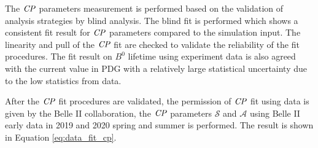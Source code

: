  

The $\it{CP}$ parameters measurement is performed based on the validation of analysis strategies by blind analysis.  
The blind fit is performed which shows a consistent fit result for $\it{CP}$ parameters compared to the simulation input. The linearity and pull of the $\it{CP}$ fit are checked to validate the reliability of the fit procedures. The fit result on $B^0$ lifetime using experiment data is also agreed with the current value in PDG with a relatively large statistical uncertainty due to the low statistics from data.

After the $\it{CP}$ fit procedures are validated, the permission of $\it{CP}$ fit using data is given by the Belle II collaboration, the $\it{CP}$ parameters $\mathcal{S}$ and $\mathcal{A}$ using Belle II early data in 2019 and 2020 spring and summer is performed. The result is shown in Equation \ref{eq:data_fit_cp}.

